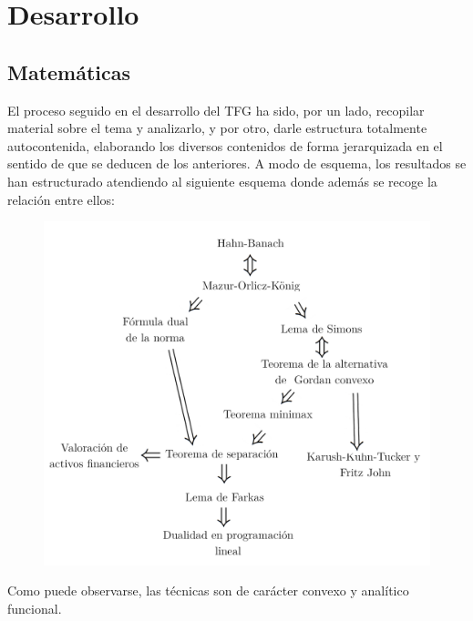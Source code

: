 \chapter{Desarrollo}
\section*{Matemáticas}
El proceso seguido en el desarrollo del TFG ha sido, por un lado, recopilar material sobre el tema y analizarlo, y por otro, darle estructura totalmente autocontenida, elaborando los diversos contenidos de forma jerarquizada en el sentido de que se deducen de los anteriores. A modo de esquema, los resultados se han estructurado atendiendo al siguiente esquema donde además se recoge la relación entre ellos: 
\begin{figure}[h!]
	\centering
	\includegraphics[width=0.9\linewidth]{imagenes/esquema.png}
	\label{fig:aux2}
\end{figure}

Como puede observarse, las técnicas son de carácter convexo y analítico funcional.

